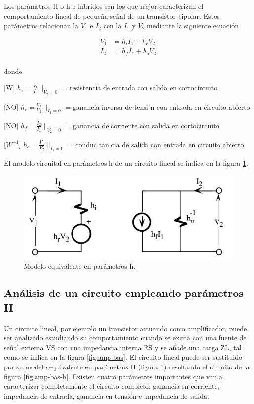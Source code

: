 \documentclass[10pt, a4paper]{article}
\begin{document}
    Los parámetros {H} o h o híbridos son los que mejor caracterizan el comportamiento lineal de pequeña señal de un transistor bipolar. Estos parámetros relacionan la $V_1$ e $I_2$ con la $I_1$ y $V_2$ mediante la siguiente ecuación
    
    \begin{equation*}
        \begin{split}
            V_1 & = h_iI_1 + h_rV_2 \\
            I_2 & = h_fI_1 + h_oV_2 \\
        \end{split}
    \end{equation*}

    donde

    [W] $h_i = \frac{V_1}{I_1}\|_{V_2 = 0}$ = resistencia de entrada con salida en cortocircuito.

    [NO] $h_r = \frac{V_1}{V_2}\|_{I_1 = 0}$ = ganancia inversa de tensi n con entrada en circuito abierto

    [NO] $h_f = \frac{I_2}{I_1}\|_{V_2 = 0}$ = ganancia de corriente con salida en cortocircuito

    [$W^{-1}$] $h_o = \frac{V_1}{V_2}\|_{I_1 = 0}$ = conduc tan cia de salida con entrada en circuito abierto

    El modelo circuital en parámetros h de un circuito lineal se indica en la figura \ref{fig:h}.


    \begin{figure}[h!]
        \centering
        \includegraphics[height=4cm\textwidth]{parametrosh.jpg}
        \caption{Modelo equivalente en parámetros h.}
        \label{fig:h}
    \end{figure}

    \subsection{Análisis de un circuito empleando parámetros {H}}

    Un circuito lineal, por ejemplo un transistor actuando como amplificador, puede ser analizado estudiando su comportamiento cuando se excita con una fuente de señal externa VS con una impedancia interna RS y se añade una carga ZL, tal como se indica en la figura \ref{fig:amp-bas}. El circuito lineal puede ser sustituido por su modelo equivalente en parámetros {H} (figura \ref{fig:h}) resultando el circuito de la figura \ref{fig:amp-bas-h}. Existen cuatro parámetros importantes que van a caracterizar completamente el circuito completo: ganancia en corriente, impedancia de entrada, ganancia en tensión e impedancia de salida.
\end{document}
